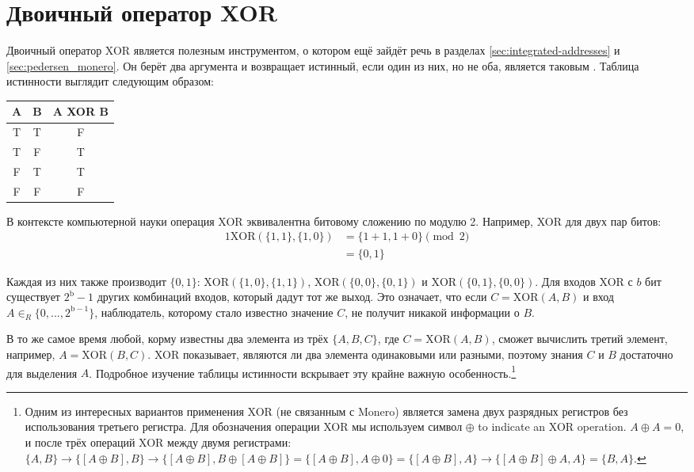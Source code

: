 \section{Двоичный оператор XOR}
\label{sec:XOR_section}

Двоичный оператор XOR является полезным инструментом, о котором ещё зайдёт речь в разделах \ref{sec:integrated-addresses} и \ref{sec:pedersen_monero}. Он берёт два аргумента и возвращает истинный, если один из них, но не оба, является таковым \cite{wolfram-xor}. Таблица истинности выглядит следующим образом:

\begin{center}
    \begin{tabular}{|c|c|c|}
    \hline
        A & B & A XOR B \\
    \hline\hline
        T & T & F \\
    \hline
        T & F & T \\
    \hline
        F & T & T \\
    \hline
        F & F & F \\
    \hline
    \end{tabular}
\end{center}

В контексте компьютерной науки операция XOR эквивалентна битовому сложению по модулю 2. Например, XOR для двух пар битов:
\begin{alignat*}{1}
    \text{XOR}(\{1,1\},\{1,0\}) &= \{1+1,1+0\} \pmod 2 \\
                                &= \{0,1\} 
\end{alignat*}

Каждая из них также производит $\{0,1\}$: $\text{XOR}(\{1,0\},\{1,1\})$, $\text{XOR}(\{0,0\},\{0,1\})$ и \linebreak $\text{XOR}(\{0,1\},\{0,0\})$. Для входов XOR с $b$ бит существует $2^{\text{b}} - 1$ других комбинаций входов, который дадут тот же выход. Это означает, что если $C = \text{XOR}(A,B)$ и вход $A \in_R \{0,...,2^{\text{b}-1}\}$, наблюдатель, которому стало известно значение $C$, не получит никакой информации о $B$.

В то же самое время любой, корму известны два элемента из трёх $\{A,B,C\}$, где $C = \text{XOR}(A,B)$, сможет вычислить третий элемент, например, $A = \text{XOR}(B,C)$. XOR показывает, являются ли два элемента одинаковыми или разными, поэтому знания $C$ и $B$ достаточно для выделения $A$. Подробное изучение таблицы истинности вскрывает эту крайне важную особенность.\footnote{Одним из интересных вариантов применения XOR (не связанным с Monero) является замена двух разрядных регистров без использования третьего регистра. Для обозначения операции XOR мы используем символ $\oplus$ to indicate an XOR operation. $A \oplus A = 0$, и после трёх операций XOR между двумя регистрами: $\{A, B\} \rightarrow{} \{[A \oplus B], B\} \rightarrow{} \{[A \oplus B], B \oplus [A \oplus B]\} = \{[A \oplus B], A \oplus 0\} = \{[A \oplus B], A\} \rightarrow{} \{[A \oplus B] \oplus A, A\} = \{B, A\}$.}